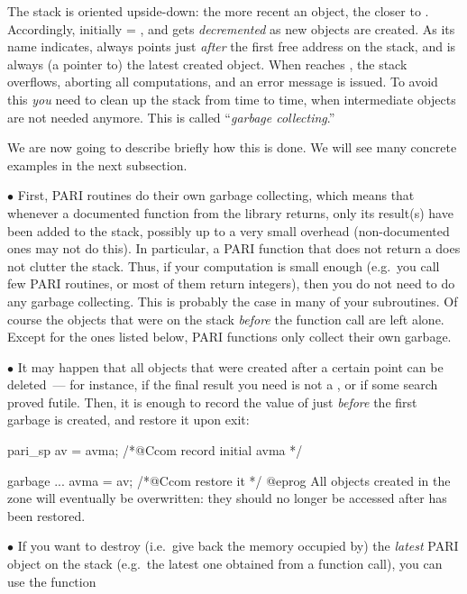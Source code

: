 The stack is oriented upside-down: the more recent an object, the closer to
. Accordingly, initially  = , and  gets
\emph{decremented} as new objects are created. As its name indicates,
 always points just \emph{after} the first free address on the
stack, and  is always (a pointer to) the latest created object.
When  reaches , the stack overflows, aborting all
computations, and an error message is issued. To avoid this \emph{you}
need to clean up the stack from time to time, when intermediate objects are
not needed anymore. This is called ``\emph{garbage collecting}.''

We are now going to describe briefly how this is done. We will see many
concrete examples in the next subsection.

\noindent$\bullet$
First, PARI routines do their own garbage collecting, which means that
whenever a documented function from the library returns, only its result(s)
have been added to the stack, possibly up to a very small overhead
(non-documented ones may not do this). In
particular, a PARI function that does not return a  does not clutter
the stack. Thus, if your computation is small enough (e.g.~you call few PARI
routines, or most of them return  integers), then you do not need
to do any garbage collecting. This is probably the case in many of your
subroutines. Of course the objects that were on the stack \emph{before} the
function call are left alone. Except for the ones listed below, PARI
functions only collect their own garbage.

\noindent$\bullet$
It may happen that all objects that were created after a certain point can
be deleted~--- for instance, if the final result you need is not a
, or if some search proved futile. Then, it is enough to record
the value of  just \emph{before} the first garbage is created,
and restore it upon exit:

\bprog
pari_sp av = avma; /*@Ccom record initial avma */

garbage ...
avma = av; /*@Ccom restore it */
@eprog
\noindent All objects created in the  zone will eventually
be overwritten: they should no longer be accessed after  has been
restored.

\noindent$\bullet$
If you want to destroy (i.e.~give back the memory occupied by) the
\emph{latest} PARI object on the stack (e.g.~the latest one obtained from a
function call), you can use the function%

